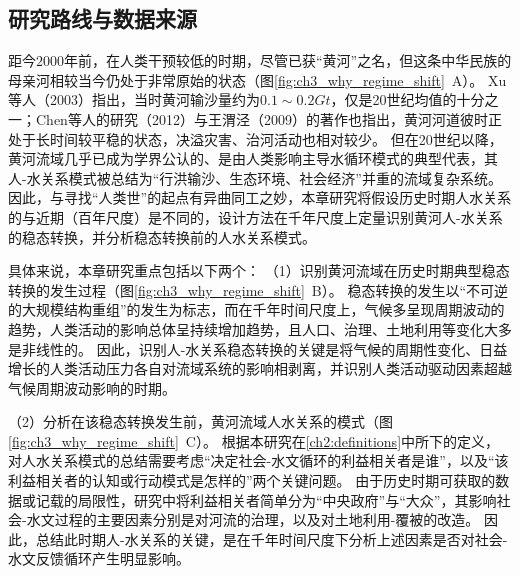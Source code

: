 \subsection{研究路线与数据来源}
\label{sec:ch3:method}


距今$2000$年前，在人类干预较低的时期，尽管已获“黄河”之名，但这条中华民族的母亲河相较当今仍处于非常原始的状态（图\ref{fig:ch3_why_regime_shift}~A）。
Xu等人（2003）\cite{xu2003a}指出，当时黄河输沙量约为$0.1\sim0.2 Gt$，仅是20世纪均值的十分之一；Chen等人的研究（2012）\cite{chen2012}与王渭泾（2009）\cite{WangWeiJing2009}的著作也指出，黄河河道彼时正处于长时间较平稳的状态，决溢灾害、治河活动也相对较少。
但在20世纪以降，黄河流域几乎已成为学界公认的、是由人类影响主导水循环模式的典型代表，其人-水关系模式被总结为“行洪输沙、生态环境、社会经济”并重的流域复杂系统\cite{jiang2020b}。
因此，与寻找“人类世”的起点有异曲同工之妙，本章研究将假设历史时期人水关系的与近期（百年尺度）是不同的，设计方法在千年尺度上定量识别黄河人-水关系的稳态转换，并分析稳态转换前的人水关系模式。

具体来说，本章研究重点包括以下两个：
（1）识别黄河流域在历史时期典型稳态转换的发生过程（图\ref{fig:ch3_why_regime_shift}~B）。
稳态转换的发生以“不可逆的大规模结构重组”的发生为标志，而在千年时间尺度上，气候多呈现周期波动的趋势，人类活动的影响总体呈持续增加趋势，且人口、治理、土地利用等变化大多是非线性的\cite{GeQuanSheng2011}。
因此，识别人-水关系稳态转换的关键是将气候的周期性变化、日益增长的人类活动压力各自对流域系统的影响相剥离，并识别人类活动驱动因素超越气候周期波动影响的时期。

（2）分析在该稳态转换发生前，黄河流域人水关系的模式（图\ref{fig:ch3_why_regime_shift}~C）。
根据本研究在\ref{ch2:definitions}中所下的定义，对人水关系模式的总结需要考虑“决定社会-水文循环的利益相关者是谁”，以及“该利益相关者的认知或行动模式是怎样的”两个关键问题。
由于历史时期可获取的数据或记载的局限性，研究中将利益相关者简单分为“中央政府”与“大众”，其影响社会-水文过程的主要因素分别是对河流的治理，以及对土地利用-覆被的改造。
因此，总结此时期人-水关系的关键，是在千年时间尺度下分析上述因素是否对社会-水文反馈循环产生明显影响。

